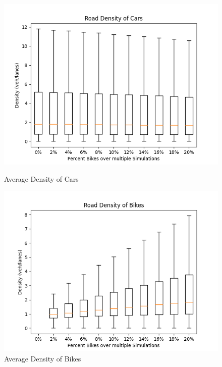 \begin{figure}[H]
    \centering
    \begin{minipage}{0.45\textwidth}
        \centering
        \includegraphics[width=\linewidth]{./figures/road_density_car.png} 
         \caption{Average Density of Cars}\label{avg-density-cars}
    \end{minipage}
    \begin{minipage}{0.45\textwidth}
        \centering
        \includegraphics[width=\linewidth]{./figures/road_density_bike.png} 
         \caption{Average Density of Bikes}\label{avg-density-bikes}
    \end{minipage}
\end{figure}
\vspace{-0.6cm}
